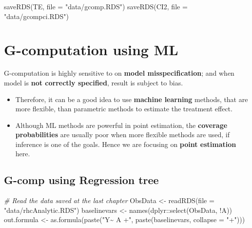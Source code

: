 \documentclass[
]{book}
\newenvironment{Shaded}{\begin{snugshade}}{\end{snugshade}}
\newcommand{\AttributeTok}[1]{\textcolor[rgb]{0.77,0.63,0.00}{#1}}
\newcommand{\CommentTok}[1]{\textcolor[rgb]{0.56,0.35,0.01}{\textit{#1}}}
\newcommand{\FunctionTok}[1]{\textcolor[rgb]{0.00,0.00,0.00}{#1}}
\newcommand{\NormalTok}[1]{#1}
\newcommand{\OtherTok}[1]{\textcolor[rgb]{0.56,0.35,0.01}{#1}}
\newcommand{\SpecialCharTok}[1]{\textcolor[rgb]{0.00,0.00,0.00}{#1}}
\newcommand{\StringTok}[1]{\textcolor[rgb]{0.31,0.60,0.02}{#1}}
\providecommand{\tightlist}{%
  \setlength{\itemsep}{0pt}\setlength{\parskip}{0pt}}
\begin{document}
\begin{Shaded}
\begin{Highlighting}[]
\FunctionTok{saveRDS}\NormalTok{(TE, }\AttributeTok{file =} \StringTok{"data/gcomp.RDS"}\NormalTok{)}
\FunctionTok{saveRDS}\NormalTok{(CI2, }\AttributeTok{file =} \StringTok{"data/gcompci.RDS"}\NormalTok{)}
\end{Highlighting}
\end{Shaded}

\hypertarget{g-computation-using-ml}{%
\chapter{G-computation using ML}\label{g-computation-using-ml}}

\begin{rmdcomment}
G-computation is highly sensitive to on \textbf{model misspecification};
and when model is \textbf{not correctly specified}, result is subject to
bias.
\end{rmdcomment}

\begin{itemize}
\tightlist
\item
  Therefore, it can be a good idea to use \textbf{machine learning} methods, that are more flexible, than parametric methods to estimate the treatment effect.
\item
  Although ML methods are powerful in point estimation, the \textbf{coverage probabilities} are usually poor when more flexible methods are used, if inference is one of the goals. Hence we are focusing on \textbf{point estimation} here.
\end{itemize}

\hypertarget{g-comp-using-regression-tree}{%
\section{G-comp using Regression tree}\label{g-comp-using-regression-tree}}

\begin{Shaded}
\begin{Highlighting}[]
\CommentTok{\# Read the data saved at the last chapter}
\NormalTok{ObsData }\OtherTok{\textless{}{-}} \FunctionTok{readRDS}\NormalTok{(}\AttributeTok{file =} \StringTok{"data/rhcAnalytic.RDS"}\NormalTok{)}
\NormalTok{baselinevars }\OtherTok{\textless{}{-}} \FunctionTok{names}\NormalTok{(dplyr}\SpecialCharTok{::}\FunctionTok{select}\NormalTok{(ObsData, }\SpecialCharTok{!}\NormalTok{A))}
\NormalTok{out.formula }\OtherTok{\textless{}{-}} \FunctionTok{as.formula}\NormalTok{(}\FunctionTok{paste}\NormalTok{(}\StringTok{"Y\textasciitilde{} A +"}\NormalTok{,}
                               \FunctionTok{paste}\NormalTok{(baselinevars,}
                                     \AttributeTok{collapse =} \StringTok{"+"}\NormalTok{)))}
\end{Highlighting}
\end{Shaded}
\end{document}
